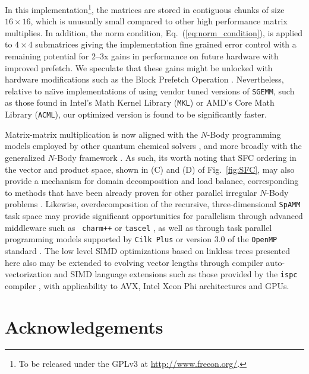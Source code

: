 In this implementation\footnote{To be released under the GPLv3 at
\url{http://www.freeon.org/}.}, the matrices are stored in contiguous chunks
of size $16 \times 16$, which is unusually small compared to other high
performance matrix multiplies. In addition, the norm condition,
Eq.~(\ref{eq:norm_condition}), is applied to $4 \times 4$ submatrices giving
the implementation fine grained error control with a remaining potential for
2--3x gains in performance on future hardware with improved prefetch.  We
speculate that these gains might be unlocked with hardware modifications such
as the Block Prefetch Operation \cite{karlsson2000prefetching}.  Nevertheless,
relative to na\"{\i}ve implementations of \SpAMM{} using vendor tuned versions
of {\tt SGEMM}, such as those found in Intel's Math Kernel Library ({\tt MKL})
or AMD's Core Math Library ({\tt ACML}), our optimized version is found to be
significantly faster.

Matrix-matrix multiplication is now aligned with the $N$-Body programming
models employed by other quantum chemical solvers
\cite{Challacombe:1996:QCTCb, Challacombe:2000:HiCu, Challacombe:1996:QCTCa},
and more broadly with the generalized $N$-Body framework
\cite{hernquist1988hierarchical, liu1994experiences, Gray:2001:NBody,
Gray:2003:NBody}.  As such, its worth noting that SFC ordering in the vector
and product space, shown in (C) and (D) of Fig.~\ref{fig:SFC}, may also
provide a mechanism for domain decomposition and load balance, corresponding
to methods that have been already proven for other parallel irregular $N$-Body
problems \cite{Warren:1992:HOT, Warren:1995:HOTb, Aluru:1997:SFC,
Campbell:2003:SFC, Devine:2005:SFC}.  Likewise, overdecomposition of the
recursive, three-dimensional {\tt SpAMM} task space may provide significant
opportunities for parallelism through advanced middleware such as {\tt
charm++} \cite{CharmppPPWCPP96} or {\tt tascel} \cite{lifflander2012work,
ma2012data}, as well as through task parallel programming models supported by
{\tt Cilk Plus} \cite{cilkplus} or version 3.0 of the {\tt OpenMP} standard
\cite{openmp}.  The low level SIMD optimizations based on linkless trees
presented here also may be extended to evolving vector lengths through
compiler auto-vectorization and SIMD language extensions such as those
provided by the {\tt ispc} compiler \cite{ispc}, with applicability to AVX,
Intel Xeon Phi architectures and GPUs.

\section*{Acknowledgements}


